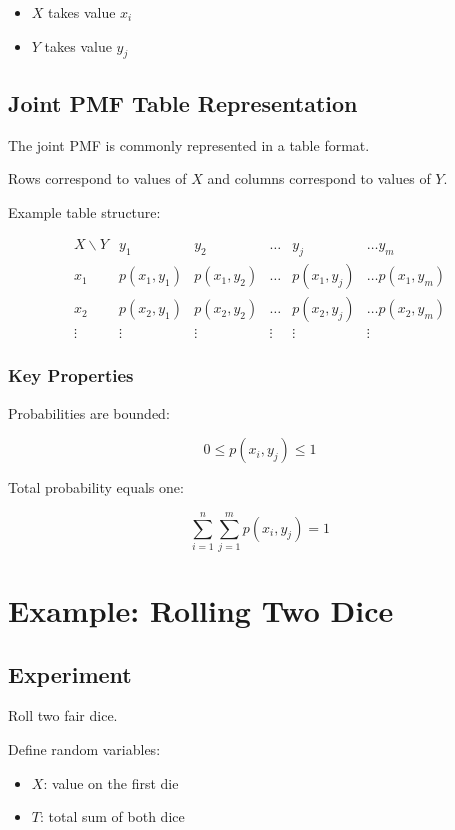 \documentclass{article}
\begin{document}
\begin{itemize}
\item $X$ takes value $x_i$
\item $Y$ takes value $y_j$
\end{itemize}

\subsection{Joint PMF Table Representation}

The joint PMF is commonly represented in a table format.

Rows correspond to values of $X$ and columns correspond to values of $Y$.

Example table structure:

\[
\begin{array}{c|ccccc}
X \backslash Y & y_1 & y_2 & \dots & y_j & \dots y_m \\
\hline
x_1 & p(x_1,y_1) & p(x_1,y_2) & \dots & p(x_1,y_j) & \dots p(x_1,y_m) \\
x_2 & p(x_2,y_1) & p(x_2,y_2) & \dots & p(x_2,y_j) & \dots p(x_2,y_m) \\
\vdots & \vdots & \vdots & \vdots & \vdots & \vdots
\end{array}
\]

\subsubsection*{Key Properties}

Probabilities are bounded:

\[
0 \le p(x_i,y_j) \le 1
\]

Total probability equals one:

\[
\sum_{i=1}^{n}\sum_{j=1}^{m} p(x_i,y_j)=1
\]

\section{Example: Rolling Two Dice}

\subsection*{Experiment}

Roll two fair dice.

Define random variables:

\begin{itemize}
\item $X$: value on the first die
\item $T$: total sum of both dice
\end{itemize}
\end{document}
